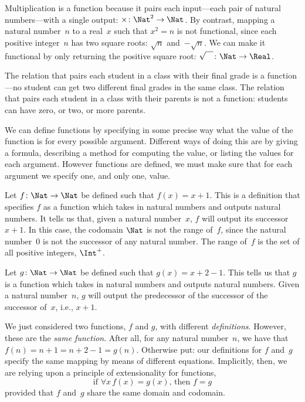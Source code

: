 \documentclass[../../../include/open-logic-section]{subfiles}
\begin{document}
\begin{ex}
Multiplication is a function because it pairs each input---each pair
of natural numbers---with a single output: $\times \colon \Nat^2 \to
\Nat$. By contrast, mapping a natural number~$n$ to a real~$x$ such
that $x^2 = n$ is not functional, since each positive integer~$n$ has two
square roots: $\sqrt{n}$ and~$-\sqrt{n}$. We can make it functional by
only returning the positive square root: $\sqrt{\phantom{X}} \colon
\Nat \to \Real$. 
\end{ex}

\begin{ex}
The relation that pairs each student in a class with their final grade
is a function---no student can get two different final grades in the
same class. The relation that pairs each student in a class with their
parents is not a function: students can have zero, or two, or more
parents.
\end{ex}

\begin{explain}
We can define functions by specifying in some precise way what the
value of the function is for every possible argument. Different ways of
doing this are by giving a formula, describing a method for computing
the value, or listing the values for each argument. However functions
are defined, we must make sure that for each argument we specify one,
and only one, value.
\end{explain}


\begin{ex}
Let $f \colon \Nat \to \Nat$ be defined such that $f(x) = x+1$. This
is a definition that specifies $f$ as a function which takes in
natural numbers and outputs natural numbers. It tells us that, given a
natural number~$x$, $f$ will output its successor~$x+1$.
In this case, the codomain $\Nat$ is not the range of~$f$, since the
natural number~$0$ is not the successor of any natural number. The
range of~$f$ is the set of all positive integers, $\Int^{+}$.
\end{ex}

\begin{ex}
Let $g \colon \Nat \to \Nat$ be defined such that $g(x) = x+2-1$. This
tells us that $g$ is a function which takes in natural numbers and
outputs natural numbers. Given a natural number~$n$, $g$ will output
the predecessor of the successor of the successor of~$x$, i.e.,
$x+1$.
\end{ex}

\begin{explain}
We just considered two functions, $f$ and $g$, with different
\emph{definitions}. However, these are the \emph{same function}. After
all, for any natural number~$n$, we have that $f(n) = n+1 = n+2-1 =
g(n)$. Otherwise put: our  definitions for $f$ and~$g$ specify the
same mapping by means of different equations. Implicitly, then, we are
relying upon a principle of extensionality for functions, 
\[
  \text{if }\forall x\, f(x) = g(x)\text{, then }f = g
\]
provided that $f$ and~$g$ share the same domain and codomain.
\end{explain}
\end{document}
